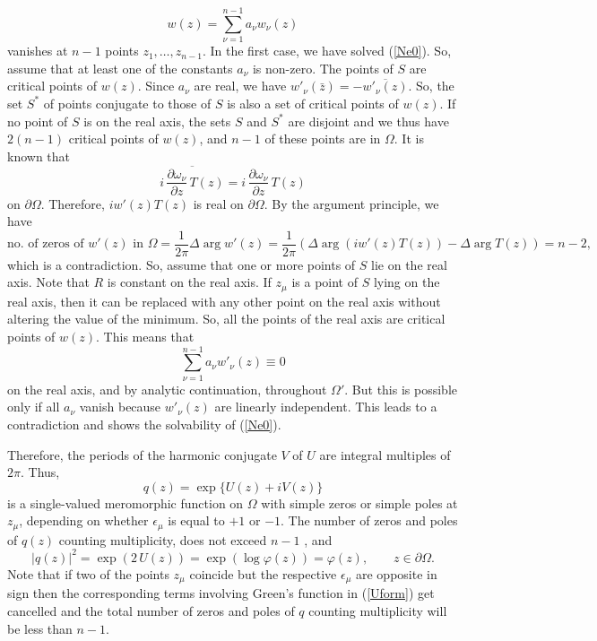 \documentclass[11pt, reqno]{amsart}
\numberwithin{equation}{section}
\newcommand{\Om}{\Omega}
\begin{document}
\[
w(z) = \sum_{\nu=1}^{n-1} a_{\nu} w_{\nu}(z)
\] 
vanishes at $n-1$ points $z_1,\ldots,z_{n-1}$. In the first case, we have solved (\ref{Ne0}). So, assume that at least one of the constants $a_{\nu}$ is non-zero. The points of $S$ are critical points of $w(z)$. Since $a_{\nu}$ are real, we have ${w'_{\nu}}(\bar{z}) = - \overline{{w'_{\nu}}(z)}$. So, the set $S^*$ of points conjugate to those of $S$ is also a set of critical points of $w(z)$. If no point of $S$ is on the real axis, the sets $S$ and $S^*$ are disjoint and we thus have $2(n-1)$ critical points of $w(z)$, and $n-1$ of these points are in $\Om$. It is known that
\[
\overline{i \,\frac{\partial \omega_{\nu}}{\partial z}\, T(z)} = i \,\frac{\partial \omega_{\nu}}{\partial z} \,T(z)
\]
on $\partial\Omega$. Therefore, $i w'(z) T(z)$ is real on $\partial\Om$. By the argument principle, we have
\[
\text{no. of zeros of } w'(z) \text{ in } \Om = \frac{1}{2\pi} \Delta \arg w'(z) 
=
\frac{1}{2\pi} \left(\Delta\arg (i w'(z) T(z)) - \Delta\arg T(z)\right) = n-2,
\]
which is a contradiction. So, assume that one or more points of $S$ lie on the real axis. Note that $R$ is constant on the real axis. If $z_{\mu}$ is a point of $S$ lying on the real axis, then it can be replaced with any other point on the real axis without altering the value of the minimum. So, all the points of the real axis are critical points of $w(z)$. This means that
\[
\sum_{\nu=1}^{n-1} a_{\nu} {w'_{\nu}}(z) \equiv 0
\]
on the real axis, and by analytic continuation, throughout $\Om'$. But this is possible only if all $a_{\nu}$ vanish because ${w'_{\nu}}(z)$ are linearly independent. This leads to a contradiction and shows the solvability of (\ref{Ne0}).

\medskip

Therefore, the periods of the harmonic conjugate $V$ of $U$ are integral multiples of $2\pi$. Thus,
\[
q(z) = \exp\{U(z) + i V(z)\}
\]
is a single-valued meromorphic function on $\Om$ with simple zeros or simple poles at $z_{\mu}$, depending on whether $\epsilon_{\mu}$ is equal to $+1$ or $-1$. The number of zeros and poles of $q(z)$ counting multiplicity, does not exceed $n-1$ , and
\[
\vert q(z)\vert ^2 = \exp(2\,U(z)) = \exp\left(\log \varphi(z)\right) = \varphi(z),
\quad \quad z\in \partial\Omega.
\]
Note that if two of the points $z_{\mu}$ coincide but the respective $\epsilon_{\mu}$ are opposite in sign then the corresponding terms involving Green's function in (\ref{Uform}) get cancelled and the total number of zeros and poles of $q$ counting multiplicity will be less than $n-1$.
\end{document}

